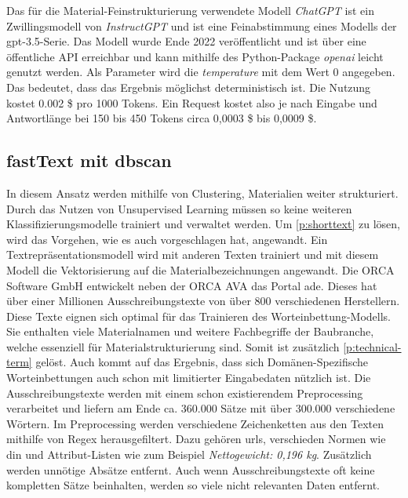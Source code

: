 Das für die Material-Feinstrukturierung verwendete Modell \textit{ChatGPT} ist ein Zwillingsmodell von \textit{InstructGPT} und ist eine Feinabstimmung eines Modells der \ac{gpt}-3.5-Serie. \citep[vgl.][]{OpenAI2022-la}
Das Modell wurde Ende 2022 veröffentlicht und ist über eine öffentliche API erreichbar und kann mithilfe des Python-Package \textit{openai} leicht genutzt werden. Als Parameter wird die \textit{temperature} mit dem Wert 0 angegeben. Das bedeutet, dass das Ergebnis möglichst deterministisch ist. \citep[vgl.][]{openai_reference} Die Nutzung kostet 0.002 \$ pro 1000 Tokens. \citep[vgl.][]{Openai_pricing} Ein Request kostet also je nach Eingabe und Antwortlänge bei 150 bis 450 Tokens circa 0,0003 \$ bis 0,0009 \$.

\subsection{fastText mit \acf{dbscan}}
\label{c:conception:fine-structuring:dbscan}
In diesem Ansatz werden mithilfe von Clustering, Materialien weiter strukturiert. Durch das Nutzen von Unsupervised Learning müssen so keine weiteren Klassifizierungsmodelle trainiert und verwaltet werden.
Um \autoref{p:shorttext} zu lösen, wird das Vorgehen, wie es auch \cite{Qingyuan2019} vorgeschlagen hat, angewandt. Ein Textrepräsentationsmodell wird mit anderen Texten trainiert und mit diesem Modell die Vektorisierung auf die Materialbezeichnungen angewandt. 
Die \glqq ORCA Software GmbH\grqq{} entwickelt neben der ORCA AVA das Portal \ac{ade}. Dieses hat über einer Millionen Ausschreibungstexte von über 800 verschiedenen Herstellern. Diese Texte eignen sich optimal für das Trainieren des Worteinbettung-Modells. Sie enthalten viele Materialnamen und weitere Fachbegriffe der Baubranche, welche essenziell für Materialstrukturierung sind. Somit ist zusätzlich \autoref{p:technical-term} gelöst. Auch \cite{nooralahzadeh2018evaluation} kommt auf das Ergebnis, dass sich Domänen-Spezifische Worteinbettungen auch schon mit limitierter Eingabedaten nützlich ist. 
Die Ausschreibungstexte werden mit einem schon existierendem Preprocessing verarbeitet und liefern am Ende ca. 360.000 Sätze mit über 300.000 verschiedene Wörtern. Im Preprocessing werden verschiedene Zeichenketten aus den Texten mithilfe von Regex herausgefiltert. Dazu gehören \ac{url}s, verschieden Normen wie \ac{din} und Attribut-Listen wie zum Beispiel \textit{Nettogewicht: 0,196 kg}. Zusätzlich werden unnötige Absätze entfernt.
Auch wenn Ausschreibungstexte oft keine kompletten Sätze beinhalten, werden so viele nicht relevanten Daten entfernt.

